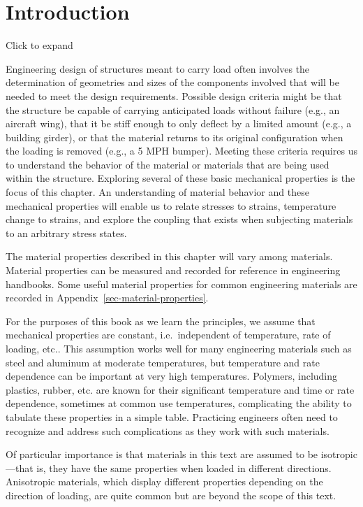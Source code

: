 \documentclass[
  letterpaper,
  DIV=11,
  numbers=noendperiod]{scrreprt}
\theoremstyle{definition}
\theoremstyle{remark}
\begin{document}
\section*{Introduction}\label{introduction-3}


Click to expand

Engineering design of structures meant to carry load often involves the
determination of geometries and sizes of the components involved that
will be needed to meet the design requirements. Possible design criteria
might be that the structure be capable of carrying anticipated loads
without failure (e.g., an aircraft wing), that it be stiff enough to
only deflect by a limited amount (e.g., a building girder), or that the
material returns to its original configuration when the loading is
removed (e.g., a 5 MPH bumper). Meeting these criteria requires us to
understand the behavior of the material or materials that are being used
within the structure. Exploring several of these basic mechanical
properties is the focus of this chapter. An understanding of material
behavior and these mechanical properties will enable us to relate
stresses to strains, temperature change to strains, and explore the
coupling that exists when subjecting materials to an arbitrary stress
states.

The material properties described in this chapter will vary among
materials. Material properties can be measured and recorded for
reference in engineering handbooks. Some useful material properties for
common engineering materials are recorded in
Appendix~\ref{sec-material-properties}.

For the purposes of this book as we learn the principles, we assume that
mechanical properties are constant, i.e.~independent of temperature,
rate of loading, etc.. This assumption works well for many engineering
materials such as steel and aluminum at moderate temperatures, but
temperature and rate dependence can be important at very high
temperatures. Polymers, including plastics, rubber, etc. are known for
their significant temperature and time or rate dependence, sometimes at
common use temperatures, complicating the ability to tabulate these
properties in a simple table. Practicing engineers often need to
recognize and address such complications as they work with such
materials.

Of particular importance is that materials in this text are assumed to
be isotropic---that is, they have the same properties when loaded in
different directions. Anisotropic materials, which display different
properties depending on the direction of loading, are quite common but
are beyond the scope of this text.
\end{document}
